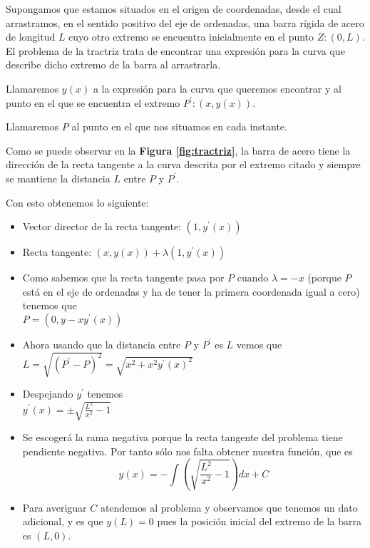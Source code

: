 \begin{example}
Supongamos que estamos situados en el origen de coordenadas, desde el cual arrastramos, en el sentido positivo del eje de ordenadas, una barra rígida de acero de longitud $L$ cuyo otro extremo se encuentra inicialmente en el punto $Z:(0,L)$. El problema de la tractriz trata de encontrar una expresión para la curva que describe dicho extremo de la barra al arrastrarla.

Llamaremos $y(x)$ a la expresión para la curva que queremos encontrar y al punto en el que se encuentra el extremo $P^\prime:(x, y(x))$.

Llamaremos $P$ al punto en el que nos situamos en cada instante.

Como se puede observar en la \textbf{Figura \ref{fig:tractriz}}, la barra de acero tiene la dirección de la recta tangente a la curva descrita por el extremo citado y siempre se mantiene la distancia $L$ entre $P$ y $P^\prime$.

Con esto obtenemos lo siguiente:
\begin{itemize}
\item Vector director de la recta tangente: $(1, y^\prime(x))$
\item Recta tangente: $(x,y(x)) + \lambda(1, y^\prime(x))$
\item Como sabemos que la recta tangente pasa por $P$ cuando $\lambda = -x$ (porque $P$ está en el eje de ordenadas y ha de tener la primera coordenada igual a cero) tenemos que \\$P=(0, y-xy^\prime(x))$
\item Ahora usando que la distancia entre $P$ y $P^\prime$ es $L$ vemos que \\$L = \sqrt{(P^\prime-P)^2} = \sqrt{x^2+x^2y^\prime(x)^2}$
\item Despejando $y^\prime$ tenemos \\$y^\prime(x)=\pm\sqrt{\frac{L^2}{x^2}-1}$
\item Se escogerá la rama negativa porque la recta tangente del problema tiene pendiente negativa. Por tanto sólo nos falta obtener nuestra función, que es $$y(x) = -\int{(\sqrt{\frac{L^2}{x^2}-1})dx} + C$$
\item Para averiguar $C$ atendemos al problema y observamos que tenemos un dato adicional, y es que $y(L)=0$ pues la posición inicial del extremo de la barra es $(L,0)$.
\end{itemize}
\end{example}

